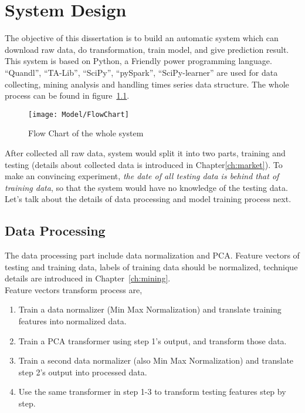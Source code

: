 \chapter{System Design}
\label{ch:system}

The objective of this dissertation is to build an automatic system which can download raw data, do transformation, train model, and give prediction result. This system is based on Python, a Friendly power programming language. “Quandl”, “TA-Lib”, “SciPy”, “pySpark”, “SciPy-learner” are used for data collecting, mining analysis and handling times series data structure. The whole process can be found in figure~\ref{fg:system_model}.
\begin{figure}[h]
	\centering
	\texttt{[image: Model/FlowChart]}
	\caption{Flow Chart of the whole system}
	\label{fg:system_model}
\end{figure}

After collected all raw data, system would split it into two parts, training and testing (details about collected data is introduced in Chapter\ref{ch:market}). To make an convincing experiment, \emph{the date of all testing data is behind that of training data}, so that the system would have no knowledge of the testing data. Let's talk about the details of data processing and model training process next.\\


\section{Data Processing}
The data processing part include data normalization and PCA. Feature vectors of testing and training data, labels of training data should be normalized, technique details are introduced in Chapter~\ref{ch:mining}.\\


Feature vectors transform process are,
\begin{enumerate}
	\item Train a data normalizer (Min Max Normalization) and translate training features into normalized data.
	\item Train a PCA transformer using step 1's output, and transform those data.
	\item Train a second data normalizer (also Min Max Normalization) and translate step 2's output into processed data.
	\item Use the same transformer in step 1-3 to transform testing features step by step.
\end{enumerate}

